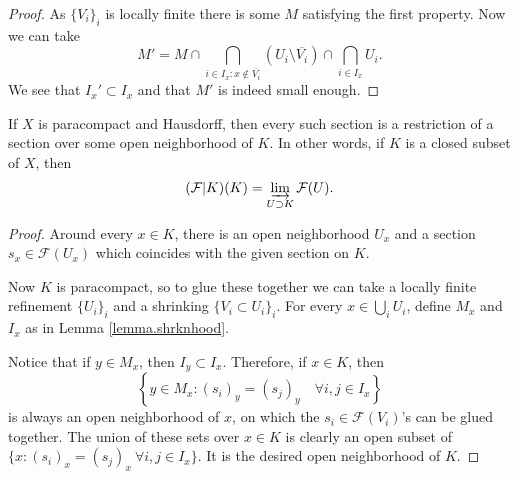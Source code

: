 \begin{proof}
    As $\{V_i\}_i$ is locally finite there is some $M$ satisfying the first property. Now we can take
    $$M'=M\cap\bigcap_{i\in I_x:x\notin\overline{V_i}}(U_i\setminus\overline{V_i})\cap\bigcap_{i\in I_x}U_i.$$
    We see that $I_x'\subset I_x$ and that $M'$ is indeed small enough.
\end{proof}

\begin{theorem}\label{thm.closedsect}
    If $X$ is paracompact and Hausdorff, then every such section is a restriction of a section over some open neighborhood of $K$. In other words, if $K$ is a closed subset of $X$, then
    $$(\mathcal{F}|K)(K)=\varinjlim_{U\supset K}\mathcal{F}(U).$$
\end{theorem}

\begin{proof}
    Around every $x\in K$, there is an open neighborhood $U_x$ and a section $s_x\in\mathcal{F}(U_x)$ which coincides with the given section on $K$.

    Now $K$ is paracompact, so to glue these together we can take a locally finite refinement $\{U_i\}_i$ and a shrinking $\{V_i\subset U_i\}_i$. For every $x\in\bigcup_iU_i$, define $M_x$ and $I_x$ as in Lemma \ref{lemma.shrknhood}.

    Notice that if $y\in M_x$, then $I_y\subset I_x$. Therefore, if $x\in K$, then
    $$\left\{y\in M_x:(s_i)_y=(s_j)_y\quad\forall i,j\in I_x\right\}$$
    is always an open neighborhood of $x$, on which the $s_i\in\mathcal{F}(V_i)$'s can be glued together. The union of these sets over $x\in K$ is clearly an open subset of $\{x:(s_i)_x=(s_j)_x\ \forall i,j\in I_x\}$. It is the desired open neighborhood of $K$.
\end{proof}

